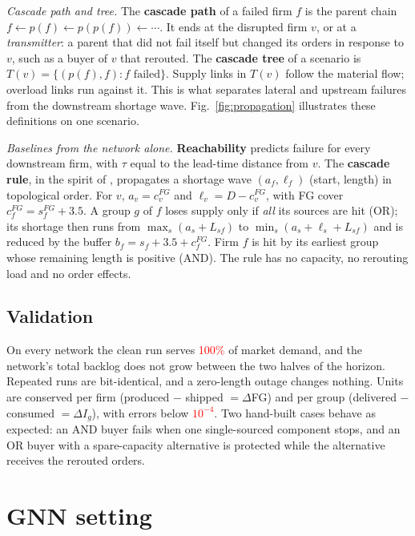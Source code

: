 \documentclass{ifacconf}
\newcommand{\pilot}[1]{\textcolor{red}{#1}}   %
\begin{document}
\emph{Cascade path and tree.} The \textbf{cascade path} of a failed firm $f$ is the parent chain $f\leftarrow p(f)\leftarrow p(p(f))\leftarrow\cdots$. It ends at the disrupted firm $v$, or at a \emph{transmitter}: a parent that did not fail itself but changed its orders in response to $v$, such as a buyer of $v$ that rerouted. The \textbf{cascade tree} of a scenario is $T(v)=\{(p(f),f): f \text{ failed}\}$. Supply links in $T(v)$ follow the material flow; overload links run against it. This is what separates lateral and upstream failures from the downstream shortage wave. Fig.~\ref{fig:propagation} illustrates these definitions on one scenario.

\emph{Baselines from the network alone.} \textbf{Reachability} predicts failure for every downstream firm, with $\tau$ equal to the lead-time distance from $v$. The \textbf{cascade rule}, in the spirit of \citet{Zhao2019}, propagates a shortage wave $(a_f,\ell_f)$ (start, length) in topological order. For $v$, $a_v=c^{FG}_v$ and $\ell_v=D-c^{FG}_v$, with FG cover $c^{FG}_f=s^{FG}_f+3.5$. A group $g$ of $f$ loses supply only if \emph{all} its sources are hit (OR); its shortage then runs from $\max_s(a_s+L_{sf})$ to $\min_s(a_s+\ell_s+L_{sf})$ and is reduced by the buffer $b_f=s_f+3.5+c^{FG}_f$. Firm $f$ is hit by its earliest group whose remaining length is positive (AND). The rule has no capacity, no rerouting load and no order effects.

\subsection{Validation}
On every network the clean run serves \pilot{100\%} of market demand, and the network's total backlog does not grow between the two halves of the horizon. Repeated runs are bit-identical, and a zero-length outage changes nothing. Units are conserved per firm (produced $-$ shipped $=\Delta$FG) and per group (delivered $-$ consumed $=\Delta I_g$), with errors below \pilot{$10^{-4}$}. Two hand-built cases behave as expected: an AND buyer fails when one single-sourced component stops, and an OR buyer with a spare-capacity alternative is protected while the alternative receives the rerouted orders.

\section{GNN setting}
\label{sec:gnn}
\end{document}
